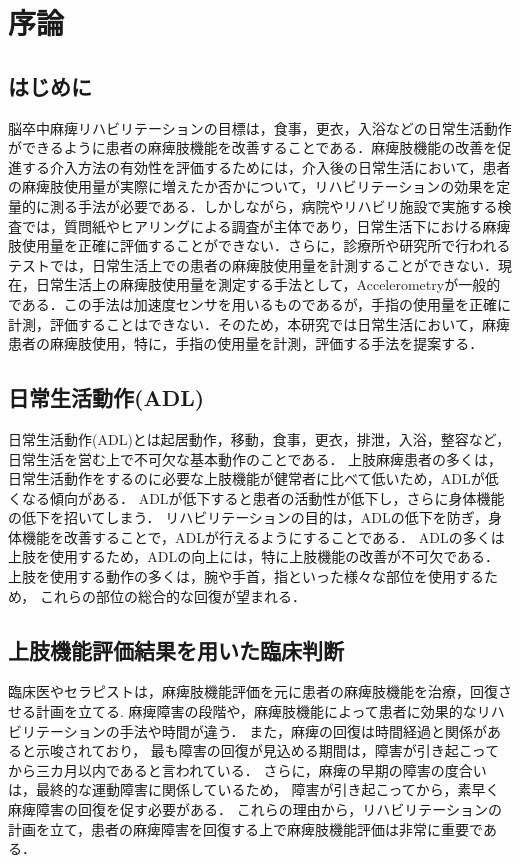\chapter{序論}

\section{はじめに}
脳卒中麻痺リハビリテーションの目標は，食事，更衣，入浴などの日常生活動作ができるように患者の麻痺肢機能を改善することである．麻痺肢機能の改善を促進する介入方法の有効性を評価するためには，介入後の日常生活において，患者の麻痺肢使用量が実際に増えたか否かについて，リハビリテーションの効果を定量的に測る手法が必要である．しかしながら，病院やリハビリ施設で実施する検査では，質問紙やヒアリングによる調査が主体であり，日常生活下における麻痺肢使用量を正確に評価することができない\cite{Taub2006,Rand2009}．さらに，診療所や研究所で行われるテストでは，日常生活上での患者の麻痺肢使用量を計測することができない．現在，日常生活上の麻痺肢使用量を測定する手法として，Accelerometryが一般的である．この手法は加速度センサを用いるものであるが，手指の使用量を正確に計測，評価することはできない．そのため，本研究では日常生活において，麻痺患者の麻痺肢使用，特に，手指の使用量を計測，評価する手法を提案する．

\section{日常生活動作(ADL)}
日常生活動作(ADL)とは起居動作，移動，食事，更衣，排泄，入浴，整容など，日常生活を営む上で不可欠な基本動作のことである．
上肢麻痺患者の多くは，日常生活動作をするのに必要な上肢機能が健常者に比べて低いため，ADLが低くなる傾向がある\cite{Zeiler2017}．
ADLが低下すると患者の活動性が低下し，さらに身体機能の低下を招いてしまう\cite{Mlinac2016}．
リハビリテーションの目的は，ADLの低下を防ぎ，身体機能を改善することで，ADLが行えるようにすることである．
ADLの多くは上肢を使用するため，ADLの向上には，特に上肢機能の改善が不可欠である．
上肢を使用する動作の多くは，腕や手首，指といった様々な部位を使用するため，
これらの部位の総合的な回復が望まれる．

\section{上肢機能評価結果を用いた臨床判断}
臨床医やセラピストは，麻痺肢機能評価を元に患者の麻痺肢機能を治療，回復させる計画を立てる.
麻痺障害の段階や，麻痺肢機能によって患者に効果的なリハビリテーションの手法や時間が違う．
また，麻痺の回復は時間経過と関係があると示唆されており，
最も障害の回復が見込める期間は，障害が引き起こってから三カ月以内であると言われている．
さらに，麻痺の早期の障害の度合いは，最終的な運動障害に関係しているため，
障害が引き起こってから，素早く麻痺障害の回復を促す必要がある\cite{Langhorne2011}．
これらの理由から，リハビリテーションの計画を立て，患者の麻痺障害を回復する上で麻痺肢機能評価は非常に重要である\cite{Lang2013}．

